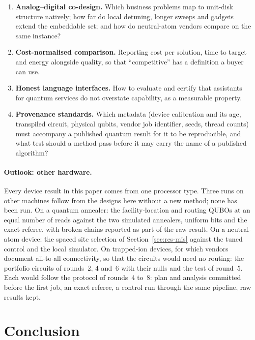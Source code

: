 \documentclass[11pt,a4paper]{article}
\begin{document}
\begin{enumerate}
        devices, with a placement by an in-session readout screen as a
        further arm.
  \item \textbf{Analog--digital co-design.} Which business problems map to
        unit-disk structure natively; how far do local detuning, longer sweeps
        and gadgets~\cite{nguyen2023} extend the embeddable set; and how do
        neutral-atom vendors compare on the same instance?
  \item \textbf{Cost-normalised comparison.} Reporting cost per solution,
        time to target and energy alongside quality, so that ``competitive''
        has a definition a buyer can use.
  \item \textbf{Honest language interfaces.} How to evaluate and certify that
        assistants for quantum services do not overstate capability, as a
        measurable property.
  \item \textbf{Provenance standards.} Which metadata (device calibration and
        its age, transpiled circuit, physical qubits, vendor job identifier,
        seeds, thread counts) must accompany a published quantum result for
        it to be reproducible, and what test should a method pass before it
        may carry the name of a published algorithm?
\end{enumerate}

\paragraph{Outlook: other hardware.} Every device result in this paper
comes from one processor type. Three runs on other machines follow from the
designs here without a new method; none has been run. On a quantum
annealer: the facility-location and routing QUBOs at an equal number of
reads against the two simulated annealers, uniform bits and the exact
referee, with broken chains reported as part of the raw result. On a
neutral-atom device: the spaced site selection of
Section~\ref{sec:res-mis} against the tuned control and the local
simulator. On trapped-ion devices, for which vendors document all-to-all
connectivity, so that the circuits would need no routing: the portfolio
circuits of rounds~2, 4 and~6 with their nulls and the test of round~5.
Each would follow the protocol of rounds~4 to~8: plan and analysis
committed before the first job, an exact referee, a control run through the
same pipeline, raw results kept.

\section{Conclusion}
\end{document}
